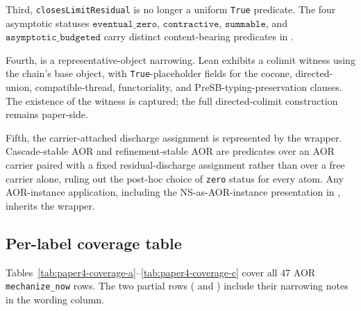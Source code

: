 \documentclass[11pt]{article}
\newcommand{\asymptoticBudgeted}{\texttt{asymptotic\_budgeted}}
\newcommand{\summable}{\texttt{summable}}
\newcommand{\contractive}{\texttt{contractive}}
\newcommand{\eventualZero}{\texttt{eventual\_zero}}
\theoremstyle{definition}
\begin{document}
Third, \texttt{closesLimitResidual} is no longer a uniform
\texttt{True} predicate.  The four asymptotic statuses
\(\eventualZero\), \(\contractive\), \(\summable\), and
\(\asymptoticBudgeted\) carry distinct content-bearing predicates in
.

Fourth,  is a representative-object
narrowing.  Lean exhibits a colimit witness using the chain's base
object, with \texttt{True}-placeholder fields for the cocone,
directed-union, compatible-thread, functoriality, and
PreSB-typing-preservation clauses.  The existence of the witness is
captured; the full directed-colimit construction remains paper-side.

Fifth, the carrier-attached discharge assignment is represented by
the  wrapper.  Cascade-stable AOR and
refinement-stable AOR are predicates over an AOR carrier paired with
a fixed residual-discharge assignment rather than over a free carrier
alone, ruling out the post-hoc choice of \texttt{zero} status for
every atom.  Any AOR-instance application, including the
NS-as-AOR-instance presentation in
\citet{Tsiokos2026NavierStokes}, inherits the wrapper.

\subsection{Per-label coverage table}
\label{subsec:paper4-coverage-table}

Tables~\ref{tab:paper4-coverage-a}--\ref{tab:paper4-coverage-c} cover all 47 AOR \texttt{mechanize\_now} rows.  The two partial rows ( and ) include their narrowing notes in the wording column.
\end{document}
